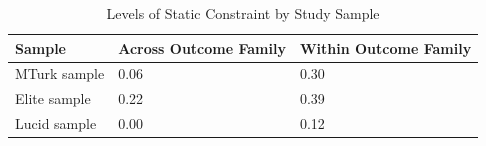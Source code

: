 \begin{table}[!h]
\centering
\caption{\label{tab:static_constraint}Levels of Static Constraint by Study Sample}
\centering
\begin{tabular}[t]{lll}
\toprule
Sample & Across Outcome Family & Within Outcome Family\\
\midrule
MTurk sample & 0.06 & 0.30\\
Elite sample & 0.22 & 0.39\\
Lucid sample & 0.00 & 0.12\\
\bottomrule
\end{tabular}
\end{table}
